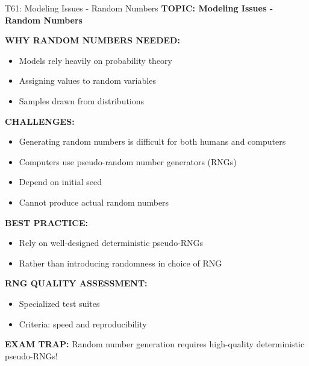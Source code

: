 \documentclass[8pt]{beamer}
\begin{document}
	\begin{frame}{T61: Modeling Issues - Random Numbers}
		\fontsize{6.5}{7.5}\selectfont
		\textbf{TOPIC: Modeling Issues - Random Numbers}
		
		\vspace{0.1cm}
		\textbf{WHY RANDOM NUMBERS NEEDED:}
		\begin{itemize}
			\item Models rely heavily on probability theory
			\item Assigning values to random variables
			\item Samples drawn from distributions
		\end{itemize}
		
		\vspace{0.1cm}
		\textbf{CHALLENGES:}
		\begin{itemize}
			\item Generating random numbers is difficult for both humans and computers
			\item Computers use pseudo-random number generators (RNGs)
			\item Depend on initial seed
			\item Cannot produce actual random numbers
		\end{itemize}
		
		\vspace{0.1cm}
		\textbf{BEST PRACTICE:}
		\begin{itemize}
			\item Rely on well-designed deterministic pseudo-RNGs
			\item Rather than introducing randomness in choice of RNG
		\end{itemize}
		
		\vspace{0.1cm}
		\textbf{RNG QUALITY ASSESSMENT:}
		\begin{itemize}
			\item Specialized test suites
			\item Criteria: speed and reproducibility
		\end{itemize}
		
		\textcolor{myred}{\textbf{EXAM TRAP:}} Random number generation requires \textcolor{myblue}{high-quality deterministic pseudo-RNGs}!
	\end{frame}
	
\end{document}
